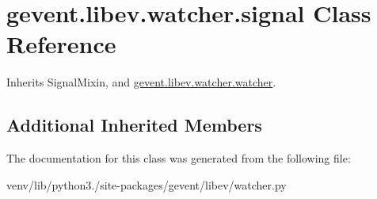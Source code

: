 \hypertarget{classgevent_1_1libev_1_1watcher_1_1signal}{}\section{gevent.\+libev.\+watcher.\+signal Class Reference}
\label{classgevent_1_1libev_1_1watcher_1_1signal}


Inherits Signal\+Mixin, and \hyperlink{classgevent_1_1libev_1_1watcher_1_1watcher}{gevent.\+libev.\+watcher.\+watcher}.

\subsection*{Additional Inherited Members}


The documentation for this class was generated from the following file\+:\begin{DoxyCompactItemize}
\item 
venv/lib/python3./site-\/packages/gevent/libev/watcher.\+py\end{DoxyCompactItemize}
